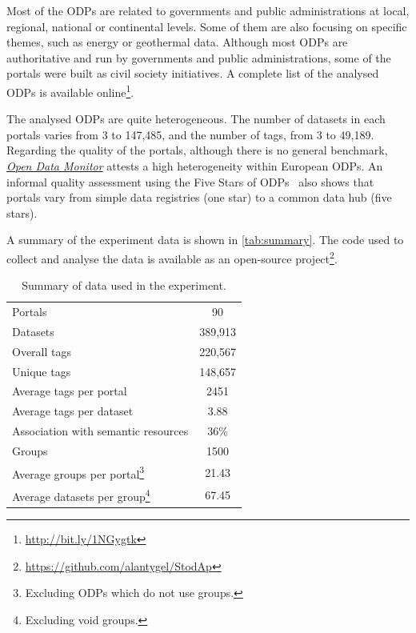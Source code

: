 \documentclass[conference]{IEEEtran}
\begin{document}
Most of the ODPs are related to governments and public administrations at local, regional, national or continental levels. 
Some of them are also focusing on specific themes, such as energy or geothermal data. 
Although most ODPs are authoritative and run by governments and public administrations, some of the portals were built as civil society initiatives.
A complete list of the analysed ODPs is available online\footnote{\url{http://bit.ly/1NGygtk}}.

The analysed ODPs are quite heterogeneous. 
The number of datasets in each portals varies from 3 to 147,485, and the number of tags, from 3 to 49,189.
Regarding the quality of the portals, although there is no general benchmark, \emph{\href{http://opendatamonitor.eu}{Open Data Monitor}} attests a high heterogeneity within European ODPs.
An informal quality assessment using the Five Stars of ODPs~\cite{Colpaert2013} also shows that portals vary from simple data registries (one star) to a common data hub (five stars).

A summary of the experiment data is shown in \autoref{tab:summary}. 
The code used to collect and analyse the data is available as an open-source project\footnote{\url{https://github.com/alantygel/StodAp}}.

\begin{savenotes}
\begin{table}[tb]
\caption{Summary of data used in the experiment.}
\label{tab:summary}
\begin{center}
\begin{tabular}{l|c}
Portals & 90 \\
Datasets & 	389,913 \\
Overall tags & 220,567 \\
Unique tags & 148,657 \\
Average tags per portal & 2451 \\	
Average tags per dataset & 3.88 \\	
Association with semantic resources & 36\% \\
Groups & 1500 \\
Average groups per portal\footnote{Excluding ODPs which do not use groups.} & 21.43 \\
Average datasets per group\footnote{Excluding void groups.} & 67.45 \\
\end{tabular}
\end{center}
\end{table}
\end{savenotes}
\end{document}
